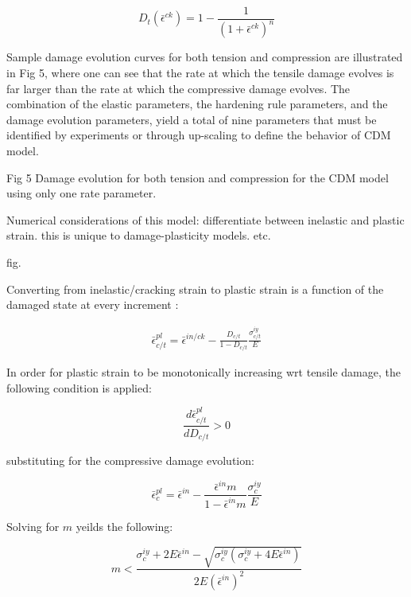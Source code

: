 \begin{equation}
D_{t}\left(\bar{\epsilon}^{ck}\right)=1-\frac{1}{\left(1+\bar{\epsilon}^{ck}\right)^{n}}\label{eqn:param4}
\end{equation}


Sample damage evolution curves for both tension and compression are
illustrated in Fig 5, where one can see that the rate at which the
tensile damage evolves is far larger than the rate at which the compressive
damage evolves. The combination of the elastic parameters, the hardening
rule parameters, and the damage evolution parameters, yield a total
of nine parameters that must be identified by experiments or through
up-scaling to define the behavior of CDM model.

Fig 5 Damage evolution for both tension and compression for the CDM
model using only one rate parameter.

Numerical considerations of this model: differentiate between inelastic and plastic strain. this is unique to damage-plasticity models. etc.

fig.

Converting from inelastic/cracking strain to plastic strain is a function
of the damaged state at every increment :

\begin{multline}
\bar{\epsilon}_{c/t}^{pl}=\bar{\epsilon}^{in/ck}-\frac{D_{c/t}}{1-D_{c/t}}\frac{\sigma_{c/t}^{iy}}{E}\label{eqn:param11}
\end{multline}


In order for plastic strain to be monotonically increasing wrt tensile
damage, the following condition is applied:

\begin{equation}
\frac{d\bar{\epsilon}_{c/t}^{pl}}{dD_{c/t}}>0\label{eqn:param6-1}
\end{equation}


substituting for the compressive damage evolution:

\begin{equation}
\bar{\epsilon}_{c}^{pl}=\bar{\epsilon}^{in}-\frac{\bar{\epsilon}^{in}m}{1-\bar{\epsilon}^{in}m}\frac{\sigma_{c}^{iy}}{E}\label{eqn:param12}
\end{equation}


Solving for $m$ yeilds the following:

\begin{equation}
m<\frac{\sigma_{c}^{iy}+2E\bar{\epsilon}^{in}-\sqrt{\sigma_{c}^{iy}\left(\sigma_{c}^{iy}+4E\bar{\epsilon}^{in}\right)}}{2E\left(\bar{\epsilon}^{in}\right)^{2}}\label{eqn:param13}
\end{equation}


